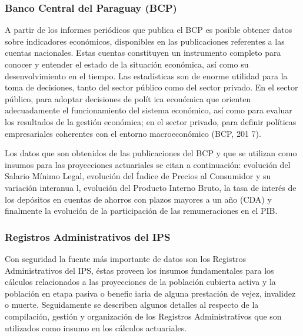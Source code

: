 \subsubsection{Banco Central del Paraguay (BCP)}

A partir de los informes periódicos que publica el BCP es posible
obtener datos sobre indicadores económicos, disponibles en las
publicaciones referentes a las cuentas nacionales. Estas cuentas
constituyen un instrumento completo para conocer y entender el estado de
la situación económica, así como su desenvolvimiento en el tiempo. Las
estadísticas son de enorme utilidad para la toma de decisiones, tanto
del sector público como del sector privado. En el sector público, para
adoptar decisiones de polít ica económica que orienten adecuadamente el
funcionamiento del sistema económico, así como para evaluar los
resultados de la gestión económica; en el sector privado, para definir
políticas empresariales coherentes con el entorno macroeconómico (BCP,
201 7).

Los datos que son obtenidos de las publicaciones del BCP y que se
utilizan como insumos para las proyecciones actuariales se citan a
continuación: evolución del Salario Mínimo Legal, evolución del Índice
de Precios al Consumidor y su variación interanua l, evolución del
Producto Interno Bruto, la tasa de interés de los depósitos en cuentas
de ahorros con plazos mayores a un año (CDA) y finalmente la evolución
de la participación de las remuneraciones en el PIB.

\subsubsection{Registros Administrativos del IPS}

Con seguridad la fuente más importante de datos son los Registros
Administrativos del IPS, éstas proveen los insumos fundamentales para
los cálculos relacionados a las proyecciones de la población cubierta
activa y la población en etapa pasiva o benefic iaria de alguna
prestación de vejez, invalidez o muerte. Seguidamente se describen
algunos detalles al respecto de la compilación, gestión y organización
de los Registros Administrativos que son utilizados como insumo en los
cálculos actuariales.

